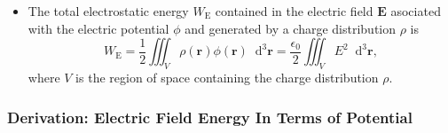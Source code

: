 \documentclass[11pt, a4paper]{article}
\newcommand{\diff}{\mathop{}\!\mathrm{d}} %
\newcommand{\dr}{\diff^{3} \r}  %
\renewcommand{\vec}[1]{\bm{#1}} %
\renewcommand{\r}{\vec{r}}
\newcommand{\E}{\vec{E}} %
\newcommand{\ee}{\epsilon_{0}}  %
\begin{document}
\begin{itemize}
    \item The total electrostatic energy $ W_{\text{E}} $ contained in the electric field $ \E $ asociated with the electric potential $ \phi $ and generated by a charge distribution $ \rho $ is
    \begin{equation*}
        W_{\text{E}} = \frac{1}{2}\iiint_{V} \rho(\r)\phi(\r)\dr = \frac{\ee}{2} \iiint_{V} E^{2} \dr,
    \end{equation*}
    where $ V $ is the region of space containing the charge distribution $ \rho $.
    
\end{itemize}
\subsubsection{Derivation: Electric Field Energy In Terms of Potential}
\end{document}
